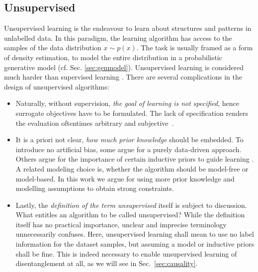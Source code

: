 	\subsection{Unsupervised}\label{sec:unsupervised}
		{Unsupervised learning} is the endeavour to learn about structures and patterns in unlabelled data. In this paradigm, the learning algorithm has access to the samples of the data distribution $x \sim p(x)$. The task is usually framed as a form of density estimation, \ie to model the entire distribution in a probabilistic generative model (cf. Sec. \ref{sec:genmodel}).
		Unsupervised learning is considered much harder than supervised learning \cite{bishop06pattern}. There are several complications in the design of unsupervised algorithms:
		\begin{itemize}
			\item Naturally, without supervision, \textit{the goal of learning is not specified}, hence surrogate objectives have to be formulated. The lack of specification renders the evaluation oftentimes arbitrary and subjective~\cite{theis15evalgen}.
			\item It is a priori not clear, \textit{how much prior knowledge} should be embedded. To introduce no artificial bias, some argue for a purely data-driven approach. Others argue for the importance of certain inductive priors to guide learning \cite{tenenbaum18think}.
			A related modeling choice is, whether the algorithm should be model-free or model-based.
			In this work we argue for using more prior knowledge and modelling assumptions to obtain strong constraints.
			\item Lastly, the \textit{definition of the term unsupervised} itself is subject to discussion. What entitles an algorithm to be called unsupervised? While the definition itself has no practical importance, unclear and imprecise terminology unnecessarily confuses. Here, unsupervised learning shall mean to use no label information for the dataset samples, but assuming a model or inductive priors shall be fine. This is indeed necessary to enable unsupervised learning of disentanglement at all, as we will see in Sec.~\ref{sec:causality}.



		\end{itemize}

